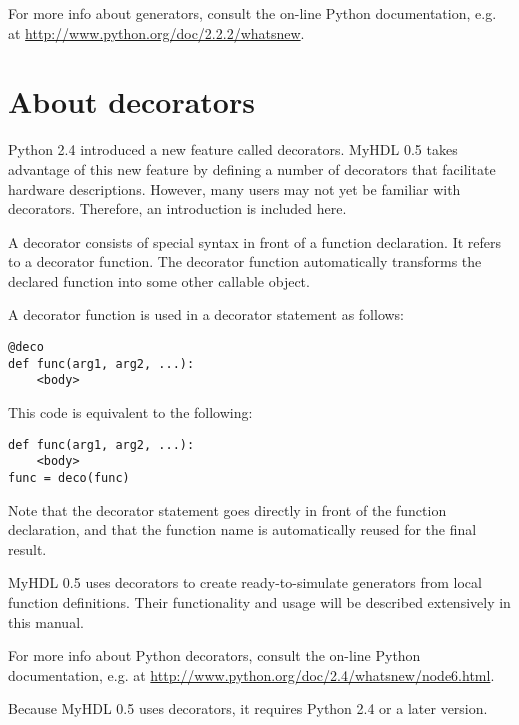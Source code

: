 For more info about generators, consult the on-line Python
documentation, e.g. at \url{http://www.python.org/doc/2.2.2/whatsnew}. 


\section{About decorators \label{deco}}

Python 2.4 introduced a new feature called decorators. MyHDL 0.5 takes
advantage of this new feature by defining a number of decorators that
facilitate hardware descriptions. However, many users may not yet be familiar with
decorators. Therefore, an introduction is included here.

A decorator consists of special syntax in front of a function
declaration. It refers to a decorator function. The decorator function
automatically transforms the declared function into some other
callable object.

A decorator function  is used in a decorator statement as follows:

\begin{verbatim}
@deco
def func(arg1, arg2, ...):
    <body>
\end{verbatim}

This code is equivalent to the following:

\begin{verbatim}
def func(arg1, arg2, ...):
    <body>
func = deco(func)
\end{verbatim}

Note that the decorator statement goes directly in front of the
function declaration, and that the function name  is automatically
reused for the final result.

MyHDL 0.5 uses decorators to create ready-to-simulate generators
from local function definitions. Their functionality
and usage will be described extensively in this manual.

For more info about Python decorators, consult the on-line Python
documentation, e.g. at \url{http://www.python.org/doc/2.4/whatsnew/node6.html}.

\begin{notice}[warning]
Because MyHDL 0.5 uses decorators, it requires Python 2.4 or a
later version.
\end{notice}
